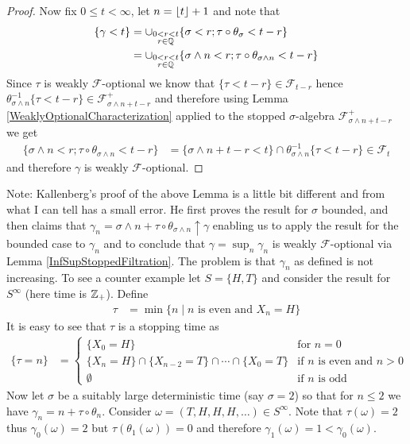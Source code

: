 \begin{proof}
Now fix $0 \leq t < \infty$, let $n = \left \lfloor t \right \rfloor+1$
and note that
\begin{align*}
\lbrace \gamma < t \rbrace &= \cup_{\substack{0 < r < t\\r \in
    \mathbb{Q}}} \lbrace \sigma < r ; \tau \circ \theta_\sigma < t -
r\rbrace \\
&=\cup_{\substack{0 < r < t\\r \in
    \mathbb{Q}}} \lbrace \sigma  \wedge n < r ; \tau \circ
\theta_{\sigma \wedge n} < t - r\rbrace
\end{align*}
Since $\tau$ is weakly $\mathcal{F}$-optional we know that $\lbrace
\tau < t-r\rbrace \in \mathcal{F}_{t-r}$ hence $\theta_{\sigma \wedge n}^{-1}
\lbrace \tau < t-r \rbrace \in \mathcal{F}^+_{\sigma \wedge n + t -r}$ and
therefore using Lemma \ref{WeaklyOptionalCharacterization} applied to
the stopped $\sigma$-algebra $\mathcal{F}^+_{\sigma  \wedge n + t -r}$ we get
\begin{align*}
\lbrace \sigma \wedge n < r ; \tau \circ \theta_{\sigma \wedge n}< t - r\rbrace &=
\lbrace \sigma \wedge n +t -r < t \rbrace \cap \theta_{\sigma \wedge n}^{-1} \lbrace \tau
< t -r\rbrace \in \mathcal{F}_t
\end{align*}
and therefore $\gamma$ is weakly $\mathcal{F}$-optional.
\end{proof}

Note: Kallenberg's proof of the above Lemma is a little bit different and
from what I can tell has a small error.  He first
proves the result for $\sigma$ bounded, and then claims that
$\gamma_n = \sigma \wedge n + \tau \circ \theta_{\sigma \wedge n} \uparrow \gamma$ enabling us to apply the result for
the bounded case to
$\gamma_n$ and to conclude that $\gamma = \sup_n \gamma_n$ is weakly
$\mathcal{F}$-optional via Lemma
\ref{InfSupStoppedFiltration}.  The problem is that $\gamma_n$ as
defined is not increasing.  To see a counter example let $S = \lbrace
H,T \rbrace$ and consider the result for $S^\infty$ (here time is $\mathbb{Z}_+$).  Define 
\begin{align*}
\tau &= \min \lbrace n \mid n \text{ is even and } X_n = H \rbrace
\end{align*}
It is easy to see that $\tau$ is a stopping time as 
\begin{align*}
\lbrace \tau = n \rbrace  &= 
\begin{cases}
\lbrace X_0 =  H \rbrace & \text{for $n = 0$} \\
\lbrace X_n = H \rbrace \cap \lbrace X_{n-2} = T \rbrace \cap \dotsb
\cap \lbrace X_0 = T \rbrace & \text{if $n$ is even and $n > 0$} \\
\emptyset & \text{if $n$ is odd}
\end{cases} 
\end{align*}
Now let $\sigma$ be
a suitably large deterministic time (say $\sigma = 2$) so that for $n \leq
2$ we have $\gamma_n = n + \tau \circ \theta_n$.  Consider
$\omega = (T,H,H,H,\dotsc) \in S^\infty$.  Note that $\tau(\omega)
= 2$ thus $\gamma_0(\omega) = 2$ but $\tau(\theta_1(\omega)) = 0$ and
therefore $\gamma_1(\omega) = 1 < \gamma_0(\omega)$. 

